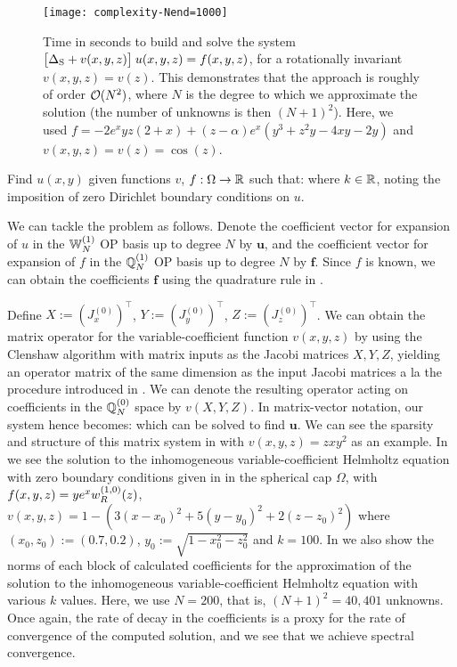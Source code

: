 \begin{figure}[tp]
	\centering %
	\centerline{\texttt{[image: complexity-Nend=1000]}}
	\caption{Time in seconds to build and solve the system $\big[\Delta_{\rm S} + v(x,y,z) \big] \: u(x,y,z) = f(x,y,z)$, for a rotationally invariant $v(x,y,z) = v(z)$. This demonstrates that the approach is roughly of order $\mathcal{O}(N^2)$, where $N$ is the degree to which we approximate the solution (the number of unknowns is then $(N+1)^2$). Here, we used $f = -2e^{x}yz(2+x) + (z - \alpha) e^{x} (y^3 + z^2 y - 4xy - 2y)$ and $v(x,y,z) = v(z) = \cos(z)$.}
	\label{fig:sc:complexity}
\end{figure}

Find $u(x,y)$ given functions $v$, $f : \Omega \to \mathbb{R}$ such that:
where $k \in \mathbb{R}$, noting the imposition of zero Dirichlet boundary conditions on $u$.

We can tackle the problem as follows. Denote the coefficient vector for expansion of $u$ in the $\mathbb{W}_N^{(1)}$ OP basis up to degree $N$ by $\mathbf{u}$, and the coefficient vector for expansion of $f$ in the ${\mathbb{Q}}^{(1)}_{N}$ OP basis up to degree $N$ by $\mathbf{f}$. Since $f$ is known, we can obtain  the coefficients $\mathbf{f}$ using the quadrature rule in . 

Define $X := (J_x^{(0)})^\top$, $Y := (J_y^{(0)})^\top$, $Z := (J_z^{(0)})^\top$. We can obtain the matrix operator for the variable-coefficient function $v(x,y,z)$ by using the Clenshaw algorithm with matrix inputs as the Jacobi matrices $X, Y, Z$, yielding an operator matrix of the same dimension as the input Jacobi matrices a la the procedure introduced in \cite{olver2019triangle}. We can denote the resulting operator acting on coefficients in the ${\mathbb{Q}}^{(0)}_{N}$ space by $v(X, Y, Z)$. In matrix-vector notation, our system hence becomes:
which can be solved to find $\mathbf{u}$. We can see the sparsity and structure of this matrix system in  with $v(x,y,z) = zxy^2$ as an example. In  we see the solution to the inhomogeneous variable-coefficient Helmholtz equation with zero boundary conditions given in  in the spherical cap $\Omega$, with $f(x,y,z) = y e^x w_R^{(1,0)}(z)$, $v(x,y,z) = 1 - (3(x-x_0)^2 + 5(y-y_0)^2 + 2(z-z_0)^2)$ where $(x_0, z_0) := (0.7, 0.2)$, $y_0 := \sqrt{1 - x_0^2 - z_0^2}$ and $k = 100$. In  we also show the norms of each block of calculated coefficients for the approximation of the solution to the inhomogeneous variable-coefficient Helmholtz equation with various $k$ values. Here, we use $N = 200$, that is, $(N+1)^2 = 40,401$ unknowns. Once again, the rate of decay in the coefficients is a proxy for the rate of convergence of the computed solution, and we see that we achieve spectral convergence.

